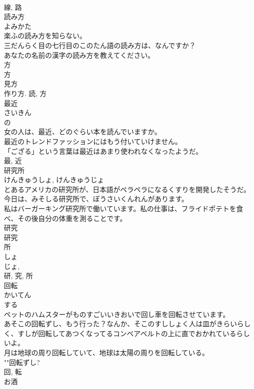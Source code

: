 \documentclass[8pt]{extreport}
\begin{document}
\begin{CJK}{UTF8}{min}
\\	線, 路	
\\	読み方	
\\	よみかた	
\\	楽ふの読み方を知らない。	
\\	三だんらく目の七行目のこのたん語の読み方は、なんですか？	
\\	あなたの名前の漢字の読み方を教えてください。	
\\	方 
\\	方 
\\	見方 
\\	作り方.	読, 方	
\\	最近	
\\	さいきん	
\\	の 
\\	女の人は、最近、どのぐらい本を読んでいますか。	
\\	最近のトレンドファッションにはもう付いていけません。	
\\	「ござる」という言葉は最近はあまり使われなくなったようだ。	
\\	最, 近	
\\	研究所	
\\	けんきゅうしょ, けんきゅうじょ	
\\	とあるアメリカの研究所が、日本語がペラペラになるくすりを開発したそうだ。	
\\	今日は、みそしる研究所で、ぼうさいくんれんがあります。	
\\	私はバーガーキング研究所で働いています。私の仕事は、フライドポテトを食べ、その後自分の体重を測ることです。	
\\	研究 
\\	研究 
\\	所 
\\	しょ 
\\	じょ, 
\\	研, 究, 所	
\\	回転	
\\	かいてん	
\\	する 
\\	ペットのハムスターがものすごいいきおいで回し車を回転させています。	
\\	あそこの回転ずし、もう行った？なんか、そこのすししょく人は皿がきらいらしく、すしが回転してあつくなってるコンベアベルトの上に直でおかれているらしいよ。	
\\	月は地球の周り回転していて、地球は太陽の周りを回転している。	
\\	""回転ずし?
\\	回, 転	
\\	お酒	

\end{CJK}
\end{document}
